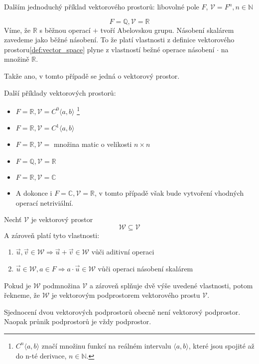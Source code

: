 Dalším jednoduchý příklad vektorového prostorů:
libovolné pole $F$, $\mathcal{V} = F^n, n \in \mathbb{N}$

\begin{example}
    $$F = \mathbb{Q}, \mathcal{V} = \mathbb{R}$$
    Víme, že $\mathbb{R}$ s běžnou operací $+$ tvoří Abelovskou grupu.
    Násobení skalárem zavedeme jako běžné násobení.
    To že platí vlastnosti z definice vektorového prostoru\ref{def:vector_space}
    plyne z vlastností bežné operace násobení $\cdot$ na množině $\mathbb{R}$.

    Takže ano, v tomto případě se jedná o vektorový prostor.
\end{example}

Další příklady vektorových prostorů:
\begin{itemize}
    \item $F = \mathbb{R}, \mathcal{V} = C^0\langle a, b \rangle$
        \footnote{$C^n\langle a,b \rangle$ značí množinu funkcí na reálném intervalu
        $\langle a,b \rangle$, které jsou spojité až do n-té derivace, $n \in \mathbb{N}$.}
    \item $F = \mathbb{R}, \mathcal{V} = C^1\langle a, b \rangle$
    \item $F = \mathbb{R}, \mathcal{V}=$ množina matic o velikosti $n \times n$
    \item $F = \mathbb{Q}, \mathcal{V} = \mathbb{R}$
    \item $F = \mathbb{R}, \mathcal{V} = \mathbb{C}$
    \item A dokonce i $F = \mathbb{C}, \mathcal{V} = \mathbb{R}$, v tomto případě však bude
        vytvoření vhodných operací netriviální.
\end{itemize}

\begin{definition}
    Nechť $\mathcal{V}$ je vektorový prostor
    $$\mathcal{W} \subseteq \mathcal{V}$$
    A zároveň platí tyto vlastnosti:
    \begin{enumerate}
        \item $\vec{u}, \vec{v} \in \mathcal{W} \Rightarrow \vec{u} + \vec{v} \in \mathcal{W}$ \hfill {} vůči aditivní operaci
        \item $\vec{u} \in \mathcal{W}, a \in F \Rightarrow  a \cdot \vec{u} \in \mathcal{W}$ \hfill {} vůči operaci násobení skalárem
    \end{enumerate}

    Pokud je $\mathcal{W}$ podmnožina $\mathcal{V}$ a zároveň splňuje dvě výše uvedené vlastnosti,
    potom řekneme, že $\mathcal{W}$ je vektorovým podprostorem vektorového prostu $\mathcal{V}$.

    Sjednocení dvou vektorových podprostorů obecně není vektorový podprostor.
    Naopak průnik podprostorů je vždy podprostor.
\end{definition}


